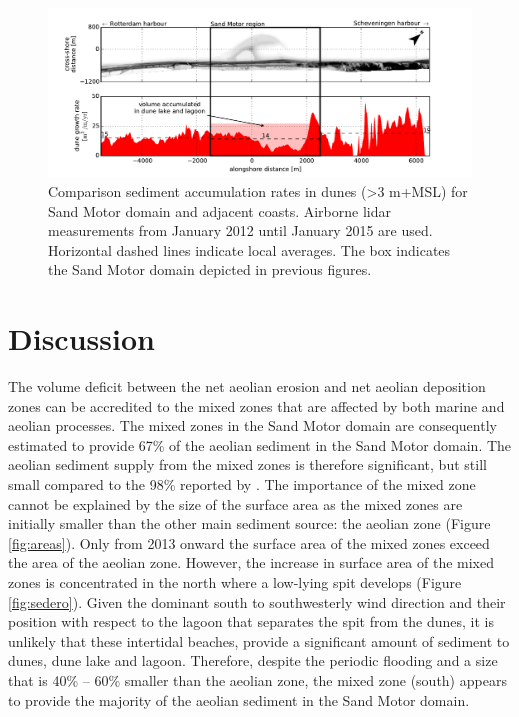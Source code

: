 \begin{figure}
 \centering
  \includegraphics[width=\columnwidth]{../Figures/adjacentcoasts}
  \caption{Comparison sediment accumulation rates in dunes
    (\textgreater 3 m+MSL) for Sand Motor domain and adjacent
    coasts. Airborne lidar measurements from January 2012 until
    January 2015 are used. Horizontal dashed lines indicate local
    averages. The box indicates the Sand Motor domain depicted in
    previous figures.}
  \label{fig:adjacentcoasts}
\end{figure}

\section{Discussion}

The volume deficit between the net aeolian erosion and net aeolian
deposition zones can be accredited to the mixed zones that are
affected by both marine and aeolian processes. The mixed zones in the
Sand Motor domain are consequently estimated to provide 67\% of the
aeolian sediment in the Sand Motor domain.  The aeolian
sediment supply from the mixed zones is therefore significant, but
still small compared to the 98\% reported by \citet{Jackson2010}. The
importance of the mixed zone cannot be explained by the size of the
surface area as the mixed zones are initially smaller than the other
main sediment source: the aeolian zone (Figure \ref{fig:areas}). Only
from 2013 onward the surface area of the mixed zones exceed the area
of the aeolian zone. However, the increase in surface area of the
mixed zones is concentrated in the north where a low-lying spit
develops (Figure \ref{fig:sedero}). Given the dominant south to
southwesterly wind direction and their position with respect to the
lagoon that separates the spit from the dunes, it is unlikely that
these intertidal beaches, provide a significant amount of sediment to
dunes, dune lake and lagoon. Therefore, despite the periodic flooding
and a size that is 40\% -- 60\% smaller than the aeolian zone, the
mixed zone (south) appears to provide the majority of the aeolian
sediment in the Sand Motor domain.

